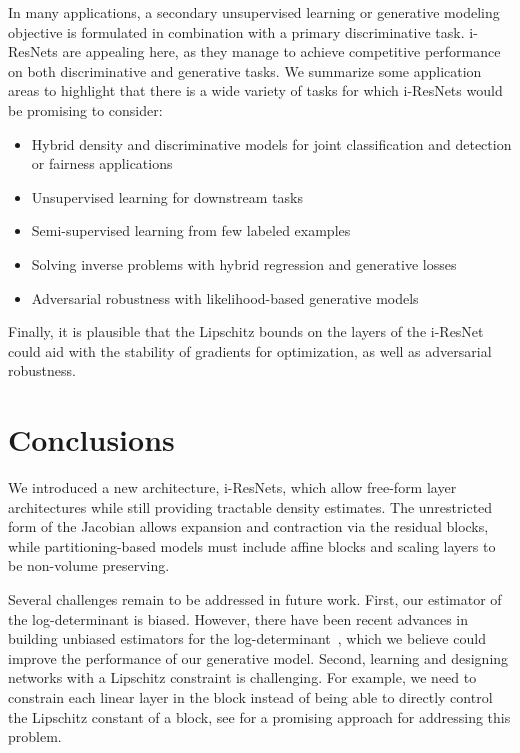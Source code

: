 \documentclass{article}
\begin{document}
In many applications, a secondary unsupervised learning or generative modeling objective is formulated in combination with a primary discriminative task. i-ResNets are appealing here, as they manage to achieve competitive performance on both discriminative and generative tasks. We summarize some application areas to highlight that there is a wide variety of tasks for which i-ResNets would be promising to consider:
\begin{itemize}
    \item Hybrid density and discriminative models for joint classification and detection or fairness applications \citep{Nalisnick2018hybrid,louizos2015variational}
    \item Unsupervised learning for downstream tasks \citep{hjelm2018learning,oord2018representation}
    \item Semi-supervised learning from few labeled examples \citep{oliver2018realistic,kingma2014semi}
    \item Solving inverse problems with hybrid regression and generative losses \citep{ardizzone2018analyzing}
    \item Adversarial robustness with likelihood-based generative models \citep{schott2018towards,jacobsen2018excessive}
\end{itemize}

Finally, it is plausible that the Lipschitz bounds on the layers of the i-ResNet could aid with the stability of gradients for optimization, as well as adversarial robustness.


\section{Conclusions}
We introduced a new architecture, i-ResNets, which allow free-form layer architectures while still providing tractable density estimates.
The unrestricted form of the Jacobian allows expansion and contraction via the residual blocks, while partitioning-based models \citep{dinh2014nice, dinh2016density, kingma2018glow} must include affine blocks and scaling layers to be non-volume preserving.


Several challenges remain to be addressed in future work.
First, our estimator of the log-determinant is biased.
However, there have been recent advances in building unbiased estimators for the log-determinant~\citep{HanGradients}, which we believe could improve the performance of our generative model.
Second, learning and designing networks with a Lipschitz constraint is challenging.
For example, we need to constrain each linear layer in the block instead of being able to directly control the Lipschitz constant of a block, see \citet{sorting} for a promising approach for addressing this problem.
\end{document}
